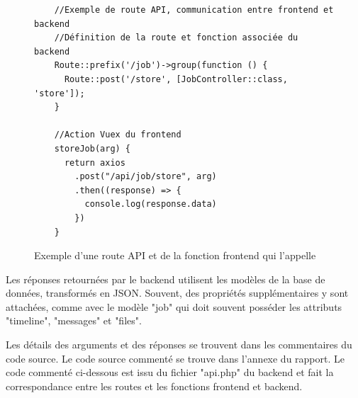 \documentclass[
    iai, %
    eai, %
]{heig-tb}
\begin{document}
\begin{figure}[h]
  \begin{verbatim}
    //Exemple de route API, communication entre frontend et backend
    //Définition de la route et fonction associée du backend
    Route::prefix('/job')->group(function () {
      Route::post('/store', [JobController::class, 'store']);
    }

    //Action Vuex du frontend
    storeJob(arg) {
      return axios
        .post("/api/job/store", arg)
        .then((response) => {
          console.log(response.data)
        })
    }
  \end{verbatim}
  \caption{Exemple d'une route API et de la fonction frontend qui l'appelle}
\end{figure}

Les réponses retournées par le backend utilisent les modèles de la base de données, transformés en JSON. Souvent, des propriétés supplémentaires y sont attachées, comme avec le modèle "job" qui doit souvent posséder les attributs "timeline", "messages" et "files".

Les détails des arguments et des réponses se trouvent dans les commentaires du code source. Le code source commenté se trouve dans l'annexe du rapport. Le code commenté ci-dessous est issu du fichier "api.php" du backend et fait la correspondance entre les routes et les fonctions frontend et backend.
\end{document}
